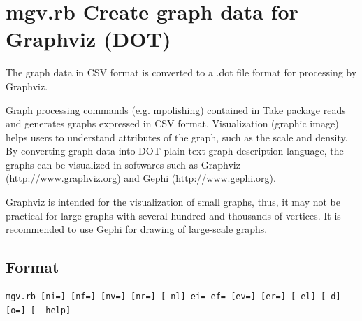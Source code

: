 



\section{mgv.rb Create graph data for Graphviz (DOT) \label{sect:mgv}}

The graph data in CSV format is converted to a .dot file format for processing by Graphviz. 
 
Graph processing commands (e.g. mpolishing) contained in Take package reads and generates graphs expressed in CSV format. 
Visualization (graphic image) helps users to understand attributes of the graph, such as the scale and density. 
By converting graph data into DOT plain text graph description language, the graphs can be visualized in softwares such as Graphviz (\url{http://www.graphviz.org}) and Gephi (\url{http://www.gephi.org}). 

Graphviz is intended for the visualization of small graphs, thus, it may not be practical for large graphs with several hundred and thousands of vertices. 
It is recommended  to use Gephi for drawing of large-scale  graphs. 

 

\subsection{Format}
\begin{verbatim}
mgv.rb [ni=] [nf=] [nv=] [nr=] [-nl] ei= ef= [ev=] [er=] [-el] [-d] [o=] [--help]
\end{verbatim}

